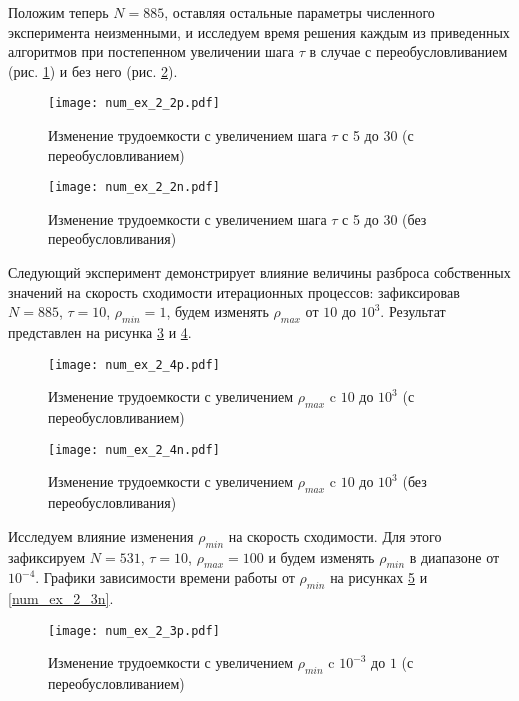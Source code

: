 \documentclass[a4paper, 14pt]{extreport} %
\begin{document}
Положим теперь $N = 885$, оставляя остальные параметры численного эксперимента неизменными, и исследуем время решения каждым из приведенных алгоритмов при постепенном увеличении шага $\tau$ в случае с переобусловливанием (рис. \ref{num_ex_2_2p}) и без него (рис. \ref{num_ex_2_2n}).

\begin{figure}[H]
\texttt{[image: num\_ex\_2\_2p.pdf]}
\caption{\small Изменение трудоемкости с увеличением шага $\tau$ с 5 до 30 (с переобусловливанием)}
\label{num_ex_2_2p}
\end{figure}

\begin{figure}[H]
\texttt{[image: num\_ex\_2\_2n.pdf]}
\caption{\small Изменение трудоемкости с увеличением шага $\tau$ с 5 до 30 (без переобусловливания) }
\label{num_ex_2_2n}
\end{figure}


Следующий эксперимент демонстрирует влияние величины разброса собственных значений на скорость сходимости итерационных процессов: зафиксировав $N=885$, $\tau = 10$, $\rho_{min}=1$, будем изменять $\rho_{max}$ от $10$ до $10^{3}$. Результат представлен на рисунка \ref{num_ex_2_4p} и \ref{num_ex_2_4n}.

\begin{figure}[H]
\texttt{[image: num\_ex\_2\_4p.pdf]}
\caption{\small Изменение трудоемкости с увеличением  $\rho_{max}$ c $10$ до $10^3$ (с переобусловливанием)}
\label{num_ex_2_4p}
\end{figure}

\begin{figure}[H]
\texttt{[image: num\_ex\_2\_4n.pdf]}
\caption{\small Изменение трудоемкости с увеличением  $\rho_{max}$ c $10$ до $10^3$ (без переобусловливания)}
\label{num_ex_2_4n}
\end{figure}

Исследуем влияние изменения $\rho_{min}$ на скорость сходимости. Для этого зафиксируем $N=531$, $\tau = 10$, $\rho_{max}=100$ и будем изменять $\rho_{min}$ в диапазоне от $10^{-4}$. Графики зависимости времени работы от $\rho_{min}$ на рисунках \ref{num_ex_2_3p} и \ref{num_ex_2_3n}.

\begin{figure}[H]
\texttt{[image: num\_ex\_2\_3p.pdf]}
\caption{\small Изменение трудоемкости с увеличением  $\rho_{min}$ c $10^{-3}$ до $1$ (с переобусловливанием)}
\label{num_ex_2_3p}
\end{figure}
\end{document}
